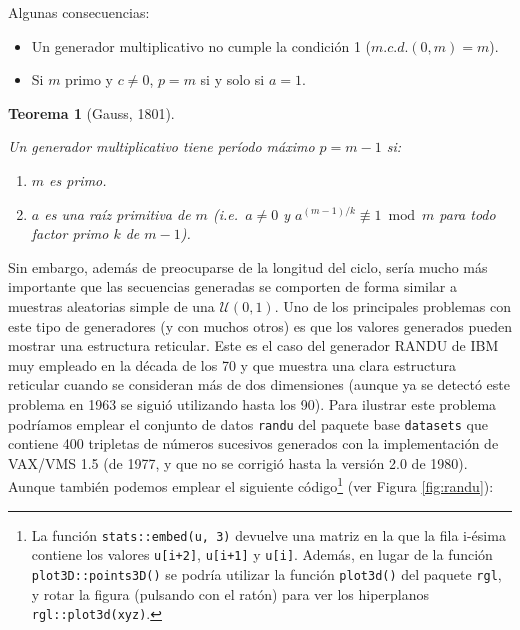 \documentclass[
  spanish,
  10pt,
]{book}
\theoremstyle{break}
\newtheorem{theorem}{Teorema}[chapter]
\theoremstyle{nonumberplain}
\let\oldfootnote\footnote
\renewcommand\footnote[1]{\oldfootnote{\hspace{2mm}#1}}
\begin{document}
Algunas consecuencias:

\begin{itemize}
\item
  Un generador multiplicativo no cumple la condición 1 (\(m.c.d.(0, m) = m\)).
\item
  Si \(m\) primo y \(c \neq 0\), \(p = m\) si y solo si \(a = 1\).
\end{itemize}

\begin{theorem}[Gauss, 1801]
\protect\hypertarget{thm:gauss}{}\label{thm:gauss}

Un generador multiplicativo tiene período máximo \(p = m-1\) si:

\begin{enumerate}
\def\labelenumi{\arabic{enumi}.}
\item
  \(m\) es primo.
\item
  \(a\) es una raíz primitiva de \(m\) (i.e.~\(a \neq 0\) y \(a^{(m-1)/k} \not\equiv 1 \bmod m\)
  para todo factor primo \(k\) de \(m - 1\)).
\end{enumerate}

\end{theorem}

Sin embargo, además de preocuparse de la longitud del ciclo, sería mucho más importante que las secuencias generadas se comporten de forma similar a muestras aleatorias simple de una \(\mathcal{U}(0,1)\).
Uno de los principales problemas con este tipo de generadores (y con muchos otros) es que los valores generados pueden mostrar una estructura reticular.
Este es el caso del generador RANDU de IBM muy empleado en la década de los 70 y que muestra una clara estructura reticular cuando se consideran más de dos dimensiones (aunque ya se detectó este problema en 1963 se siguió utilizando hasta los 90).
Para ilustrar este problema podríamos emplear el conjunto de datos \texttt{randu} del paquete base \texttt{datasets} que contiene 400 tripletas de números sucesivos generados con la implementación de VAX/VMS 1.5 (de 1977, y que no se corrigió hasta la versión 2.0 de 1980).
Aunque también podemos emplear el siguiente código\footnote{La función \texttt{stats::embed(u,\ 3)} devuelve una matriz en la que la fila i-ésima contiene los valores \texttt{u{[}i+2{]}}, \texttt{u{[}i+1{]}} y \texttt{u{[}i{]}}. Además, en lugar de la función \texttt{plot3D::points3D()} se podría utilizar la función \texttt{plot3d()} del paquete \texttt{rgl}, y rotar la figura (pulsando con el ratón) para ver los hiperplanos \texttt{rgl::plot3d(xyz)}.} (ver Figura \ref{fig:randu}):
\end{document}
